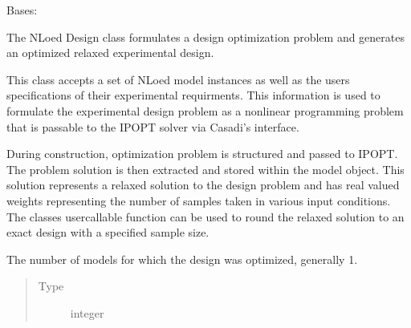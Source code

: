 \documentclass[letterpaper,10pt,english,openany,oneside]{sphinxmanual}
\begin{document}
\begin{fulllineitems}
\label{\detokenize{nloed:nloed.design.Design}}
Bases: 

The NLoed Design class formulates a design optimization problem and generates an optimized
relaxed experimental design.

This class accepts a set of NLoed model instances as well as the users specifications of their
experimental requirments. This information is used to formulate the
experimental design problem as a non\sphinxhyphen{}linear programming problem that is passable to the IPOPT
solver via Casadi’s interface.

During construction, optimization problem is structured and passed to IPOPT. The problem solution
is then extracted and stored within the model object. This solution represents a relaxed solution
to the design problem and has real valued weights representing the number of samples taken in
various input conditions. The classes user\sphinxhyphen{}callable function can be used to round the relaxed
solution to an exact design with a specified sample size.

\begin{fulllineitems}
\label{\detokenize{nloed:nloed.design.Design.num_models}}
The number of models for which the design was optimized, generally 1.
\begin{quote}\begin{description}
\item[{Type}] \leavevmode
integer

\end{description}\end{quote}

\end{fulllineitems}


\end{fulllineitems}
\end{document}
